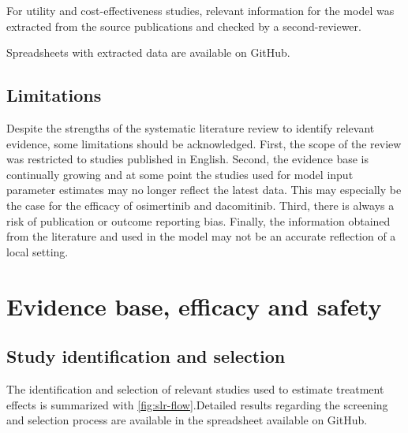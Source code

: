 \documentclass[11pt,final,fleqn]{article}\usepackage[]{graphicx}\usepackage[]{color}
\theoremstyle{plain}
\begin{document}
\begin{appendices}
For utility and cost-effectiveness studies, relevant information for the model was extracted from the source publications and checked by a second-reviewer. 

Spreadsheets with extracted data are available on GitHub.

\subsection{Limitations}
Despite the strengths of the systematic literature review to identify relevant evidence, some limitations should be acknowledged. First, the scope of the review was restricted to studies published in English. Second, the evidence base is continually growing and at some point the studies used for model input parameter estimates may no longer reflect the latest data. This may especially be the case for the efficacy of osimertinib and dacomitinib. Third, there is always a risk of publication or outcome reporting bias. Finally, the information obtained from the literature and used in the model may not be an accurate reflection of a local setting.

\section{Evidence base, efficacy and safety}
\subsection{Study identification and selection} \label{app:study-selection}
The identification and selection of relevant studies used to estimate treatment effects is summarized with \autoref{fig:slr-flow}.Detailed results regarding the screening and selection process are available in the spreadsheet available on GitHub.



\end{appendices}
\end{document}
